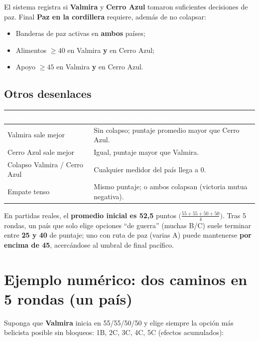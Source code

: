 \documentclass[11pt,a4paper]{article}
\newcommand{\headrow}[1]{\textcolor{white}{\textbf{#1}}}
\begin{document}
El sistema registra si \textbf{Valmira} y \textbf{Cerro Azul} tomaron suficientes decisiones de paz. Final \textbf{Paz en la cordillera} requiere, además de no colapsar:

\begin{itemize}
  \item Banderas de paz activas en \textbf{ambos} países;
  \item Alimentos $\geq 40$ en Valmira \textbf{y} en Cerro Azul;
  \item Apoyo $\geq 45$ en Valmira \textbf{y} en Cerro Azul.
\end{itemize}

\subsection{Otros desenlaces}

\begin{tabularx}{\textwidth}{@{}lX@{}}
\toprule
\rowcolor{cerro}
\headrow{Final} & \headrow{Condición (resumen)} \\
\midrule
Valmira sale mejor & Sin colapso; puntaje promedio mayor que Cerro Azul. \\
Cerro Azul sale mejor & Igual, puntaje mayor que Valmira. \\
Colapso Valmira / Cerro Azul & Cualquier medidor del país llega a 0. \\
Empate tenso & Mismo puntaje; o ambos colapsan (victoria mutua negativa). \\
\bottomrule
\end{tabularx}

\vspace{0.6em}
En partidas reales, el \textbf{promedio inicial es 52,5} puntos $\bigl(\frac{55+55+50+50}{4}\bigr)$. Tras 5 rondas, un país que solo elige opciones ``de guerra'' (muchas B/C) suele terminar entre \textbf{25 y 40} de puntaje; uno con ruta de paz (varias A) puede mantenerse \textbf{por encima de 45}, acercándose al umbral de final pacífico.

\section{Ejemplo numérico: dos caminos en 5 rondas (un país)}

Suponga que \textbf{Valmira} inicia en 55/55/50/50 y elige siempre la opción más belicista posible sin bloqueos: 1B, 2C, 3C, 4C, 5C (efectos acumulados):
\end{document}
